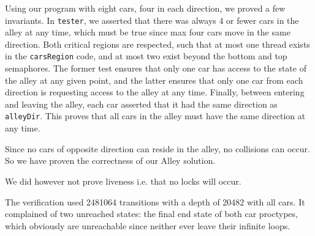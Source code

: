 Using our program with eight cars, four in each direction, we proved a few invariants. In \texttt{tester}, we asserted that there was always 4 or fewer cars in the alley at any time, which must be true since max four cars move in the same direction. Both critical regions are respected, such that at most one thread exists in the \texttt{carsRegion} code, and at most two exist beyond the bottom and top semaphores. The former test ensures that only one car has access to the state of the alley at any given point, and the latter ensures that only one car from each direction is requesting access to the alley at any time. Finally, between entering and leaving the alley, each car asserted that it had the same direction as \texttt{alleyDir}. This proves that all cars in the alley must have the same direction at any time.

Since no cars of opposite direction can reside in the alley, no collisions can occur. So we have proven the correctness of our Alley solution.

We did however not prove liveness i.e. that no locks will occur.

The verification used 2481064 transitions with a depth of 20482 with all cars. It complained of two unreached states: the final end state of both car proctypes, which obviously are unreachable since neither ever leave their infinite loops.
